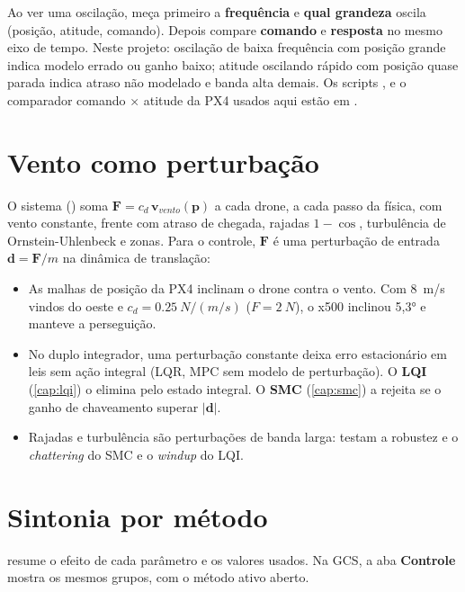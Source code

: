 \begin{dica}
Ao ver uma oscilação, meça primeiro a \textbf{frequência} e \textbf{qual grandeza} oscila
(posição, atitude, comando). Depois compare \textbf{comando} e \textbf{resposta} no mesmo
eixo de tempo. Neste projeto: oscilação de baixa frequência com posição grande indica modelo
errado ou ganho baixo; atitude oscilando rápido com posição quase parada indica atraso não
modelado e banda alta demais. Os scripts ,  e
o comparador comando × atitude da PX4 usados aqui estão em .
\end{dica}

\section{Vento como perturbação}
O sistema  () soma $\mathbf F=c_d\,\mathbf v_{vento}(\mathbf p)$
a cada drone, a cada passo da física, com vento constante, frente com atraso de chegada,
rajadas $1-\cos$, turbulência de Ornstein-Uhlenbeck e zonas. Para o controle, $\mathbf F$ é
uma perturbação de entrada $\mathbf d=\mathbf F/m$ na dinâmica de translação:
\begin{itemize}
  \item As malhas de posição da PX4 inclinam o drone contra o vento. Com \SI{8}{m/s}
        vindos do oeste e $c_d=\SI{0,25}{N/(m/s)}$ ($F=\SI{2}{N}$), o x500 inclinou
        \ang{5,3} e manteve a perseguição.
  \item No duplo integrador, uma perturbação constante deixa erro estacionário em leis sem
        ação integral (LQR, MPC sem modelo de perturbação). O \textbf{LQI}
        (\cref{cap:lqi}) o elimina pelo estado integral. O \textbf{SMC} (\cref{cap:smc})
        a rejeita se o ganho de chaveamento superar $|\mathbf d|$.
  \item Rajadas e turbulência são perturbações de banda larga: testam a robustez e o
        \emph{chattering} do SMC e o \emph{windup} do LQI.
\end{itemize}

\section{Sintonia por método}
 resume o efeito de cada parâmetro e os valores usados. Na GCS, a aba
\textbf{Controle} mostra os mesmos grupos, com o método ativo aberto.

